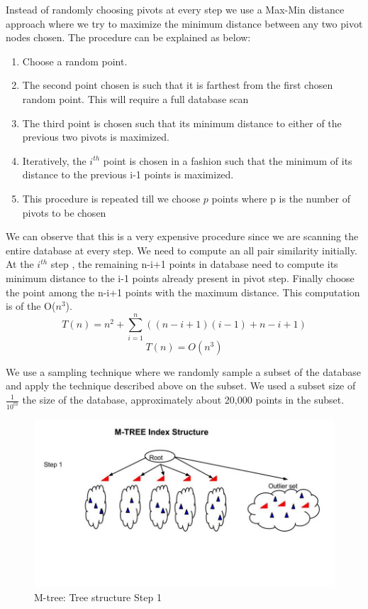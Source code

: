 Instead of randomly choosing pivots at every step we use a Max-Min distance approach where we try to maximize the minimum distance between any two pivot nodes chosen. The procedure can be explained as below:

\begin{enumerate}
	\item Choose a random point.
	\item The second point chosen is such that it is farthest from the first chosen random point. This will require a full database scan
	\item The third point is chosen such that its minimum distance to either of the previous two pivots is maximized.
	\item Iteratively, the $i^{th}$ point is chosen in a fashion such that the minimum of its distance to the previous i-1 points is maximized.
	\item This procedure is repeated till we choose $p$ points where p is the number of pivots to be chosen	\\

\end{enumerate} 

We can observe that this is a very expensive procedure since we are scanning the entire database at every step. We need to compute an all pair similarity initially. At the $i^{th}$ step , the remaining n-i+1 points in  database need to compute its minimum distance to the i-1 points already present in pivot step. Finally choose the point among the n-i+1 points with the maximum distance. This computation is of the O($n^3$).\\
	\begin{equation}
	T(n)=  n^2 + \sum \limits_{i=1}^{n}( (n-i+1)(i-1)  + n-i+1) 
	\end{equation}
	\begin{equation}
	T(n)=O(n^3)
	\end{equation}

We use a sampling technique where we randomly sample a subset of the database and apply the technique described above on the subset. We used a subset size of $\frac{1}{10^{th}}$ the size of the database, approximately about 20,000 points in the subset.


\begin{figure}[ht!]	
\centering
\includegraphics[width=1 \columnwidth]{img/image0d.jpg}
\caption{M-tree: Tree structure Step 1}
\label{fig: step1}
\end{figure}



